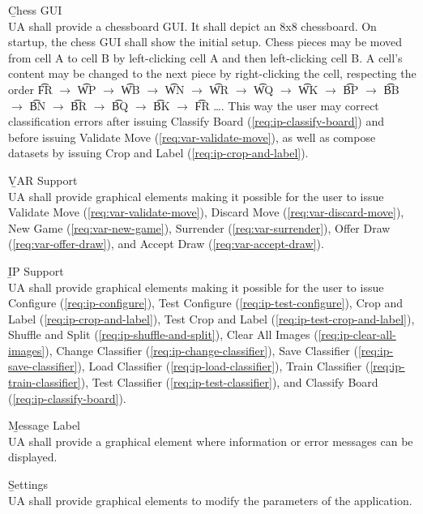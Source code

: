 \begin{enumeratenum}
\begin{enumeratenum}
            \item \b{Chess GUI} \label{req:ua-chess-gui} \\
            UA shall provide a chessboard GUI. It shall depict an 8x8 chessboard. On startup, the chess GUI shall show the initial setup. Chess pieces may be moved from cell A to cell B by left-clicking cell A and then left-clicking cell B. A cell's content may be changed to the next piece by right-clicking the cell, respecting the order \t{FR} $\rightarrow$ \t{WP} $\rightarrow$ \t{WB} $\rightarrow$ \t{WN} $\rightarrow$ \t{WR} $\rightarrow$ \t{WQ} $\rightarrow$ \t{WK} $\rightarrow$ \t{BP} $\rightarrow$ \t{BB} $\rightarrow$ \t{BN} $\rightarrow$ \t{BR} $\rightarrow$ \t{BQ} $\rightarrow$ \t{BK} $\rightarrow$ \t{FR} \dots. This way the user may correct classification errors after issuing Classify Board (\ref{req:ip-classify-board}) and before issuing Validate Move (\ref{req:var-validate-move}), as well as compose datasets by issuing Crop and Label (\ref{req:ip-crop-and-label}).

            \item \b{VAR Support} \label{req:ua-var-support} \\
            UA shall provide graphical elements making it possible for the user to issue Validate Move (\ref{req:var-validate-move}), Discard Move (\ref{req:var-discard-move}), New Game (\ref{req:var-new-game}), Surrender (\ref{req:var-surrender}), Offer Draw (\ref{req:var-offer-draw}), and Accept Draw (\ref{req:var-accept-draw}).
            
            \item \b{IP Support} \label{req:ua-ip-support} \\
            UA shall provide graphical elements making it possible for the user to issue Configure (\ref{req:ip-configure}), Test Configure (\ref{req:ip-test-configure}), Crop and Label (\ref{req:ip-crop-and-label}), Test Crop and Label (\ref{req:ip-test-crop-and-label}), Shuffle and Split (\ref{req:ip-shuffle-and-split}), Clear All Images (\ref{req:ip-clear-all-images}), Change Classifier (\ref{req:ip-change-classifier}), Save Classifier (\ref{req:ip-save-classifier}), Load Classifier (\ref{req:ip-load-classifier}), Train Classifier (\ref{req:ip-train-classifier}), Test Classifier (\ref{req:ip-test-classifier}), and Classify Board (\ref{req:ip-classify-board}).

            \item \b{Message Label} \label{req:ua-message-label} \\
            UA shall provide a graphical element where information or error messages can be displayed.

            \item \b{Settings} \label{req:ua-settings} \\
            UA shall provide graphical elements to modify the parameters of the application.
        \end{enumeratenum}
\end{enumeratenum}




